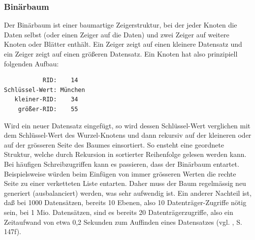 \subsubsection{Binärbaum}
Der Binärbaum ist einer baumartige Zeigerstruktur, bei der jeder Knoten die Daten selbst (oder einen Zeiger auf die Daten) und zwei Zeiger auf weitere Knoten oder Blätter enthält. Ein Zeiger zeigt auf einen kleinere Datensatz und ein Zeiger zeigt auf einen größeren Datensatz. Ein Knoten hat also prinzipiell folgenden Aufbau:
\begin{lstlisting}
           RID:    14
Schlüssel-Wert: München
   kleiner-RID:    34
    größer-RID:    55
\end{lstlisting}
Wird ein neuer Datensatz eingefügt, so wird dessen Schlüssel-Wert verglichen mit dem Schlüssel-Wert des Wurzel-Knotens und dann rekursiv auf der kleineren oder auf der grösseren Seite des Baumes einsortiert. So ensteht eine geordnete Struktur, welche durch Rekursion in sortierter Reihenfolge gelesen werden kann. Bei häufigen Schreibzugriffen kann es passieren, dass der Binärbaum entartet. Beispielsweise würden beim Einfügen von immer grösseren Werten die rechte Seite zu einer verketteten Liste entarten. Daher muss der Baum regelmässig neu generiert (ausbalanciert) werden, was sehr aufwendig ist. Ein anderer Nachteil ist, daß bei 1000 Datensätzen, bereits 10 Ebenen, also 10 Datenträger-Zugriffe nötig sein, bei 1 Mio. Datensätzen, sind es bereits 20 Datenträgerzugriffe, also ein Zeitaufwand von etwa 0,2 Sekunden zum Auffinden eines Datensatzes (vgl. \cite{Sauer1998}, S. 147f).
